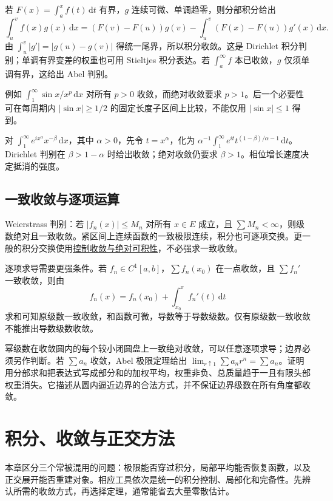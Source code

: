 \documentclass[UTF8,12pt,a4paper,fontset=fandol]{ctexart}
\begin{document}
若 $F(x)=\int_a^xf(t)\,\mathrm dt$ 有界，$g$ 连续可微、单调趋零，则分部积分给出
\[
\int_u^vf(x)g(x)\,\mathrm dx
=(F(v)-F(u))g(v)-\int_u^v(F(x)-F(u))g'(x)\,\mathrm dx.
\]
由 $\int_u^v|g'|=|g(u)-g(v)|$ 得统一尾界，所以积分收敛。这是 Dirichlet 积分判别；单调有界变差的权重也可用 Stieltjes 积分表达。若 $\int_a^\infty f$ 本已收敛，$g$ 仅须单调有界，这给出 Abel 判别。

例如 $\int_1^\infty\sin x/x^p\,\mathrm dx$ 对所有 $p>0$ 收敛，而绝对收敛要求 $p>1$。后一个必要性可在每周期内 $|\sin x|\geq1/2$ 的固定长度子区间上比较，不能仅用 $|\sin x|\leq1$ 得到。

对 $\int_1^\infty e^{ix^\alpha}x^{-\beta}\,\mathrm dx$，其中 $\alpha>0$，先令 $t=x^\alpha$，化为 $\alpha^{-1}\int_1^\infty e^{it}t^{(1-\beta)/\alpha-1}\,\mathrm dt$。Dirichlet 判别在 $\beta>1-\alpha$ 时给出收敛；绝对收敛仍要求 $\beta>1$。相位增长速度决定抵消的强度。

\subsection{一致收敛与逐项运算}

\label{app:series-uniform}

Weierstrass 判别：若 $|f_n(x)|\leq M_n$ 对所有 $x\in E$ 成立，且 $\sum M_n<\infty$，则级数绝对且一致收敛。紧区间上连续函数的一致极限连续，积分也可逐项交换。更一般的积分交换使用\hyperref[app:integration-exchange]{控制收敛与绝对可积性}，不必强求一致收敛。

逐项求导需要更强条件。若 $f_n\in C^1[a,b]$，$\sum f_n(x_0)$ 在一点收敛，且 $\sum f_n'$ 一致收敛，则由
\[
f_n(x)=f_n(x_0)+\int_{x_0}^xf_n'(t)\,\mathrm dt
\]
求和可知原级数一致收敛，和函数可微，导数等于导数级数。仅有原级数一致收敛不能推出导数级数收敛。

幂级数在收敛圆内的每个较小闭圆盘上一致绝对收敛，可以任意逐项求导；边界必须另作判断。若 $\sum a_n$ 收敛，Abel 极限定理给出 $\lim_{r\uparrow1}\sum a_nr^n=\sum a_n$。证明用分部求和把表达式写成部分和的加权平均，权重非负、总质量趋于一且有限头部权重消失。它描述从圆内逼近边界的合法方式，并不保证边界级数在所有角度都收敛。



\section{积分、收敛与正交方法}

\label{app:integration}

本章区分三个常被混用的问题：极限能否穿过积分，局部平均能否恢复函数，以及正交展开能否重建对象。相应工具依次是统一的积分控制、局部化和完备性。先辨认所需的收敛方式，再选择定理，通常能省去大量零散估计。
\end{document}
